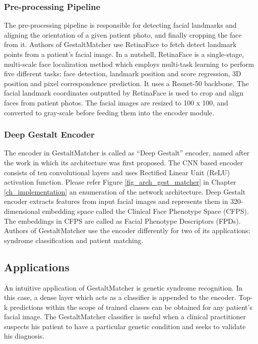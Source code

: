\documentclass[../report.tex]{subfiles}
\begin{document}
    \subsubsection{Pre-processing Pipeline}
    The pre-processing pipeline is responsible for detecting facial landmarks and aligning the orientation of a given patient photo, and finally cropping the face from it. Authors of GestaltMatcher use RetinaFace \cite{deng2020retinaface} to fetch detect landmark points from a patient's facial image.  In a nutshell, RetinaFace is a single-stage, multi-scale face localization method which employs multi-task learning to perform five different tasks: face detection, landmark position and score regression,  3D position and pixel correspondence prediction. It uses a Resnet-50 \cite{he2016deep} backbone. The facial landmark coordinates outputted by RetinaFace is used to crop and align faces from patient photos. The facial images are resized to 100 x 100, and converted to gray-scale before feeding them into the encoder module.
    
    \subsubsection{Deep Gestalt Encoder}
    The encoder in GestaltMatcher is called as \enquote{Deep Gestalt} encoder, named after the work \cite{Gurovich2019} in which its architecture was first proposed. The CNN based encoder consists of ten convolutional layers and uses Rectified Linear Unit (ReLU) activation function. Please refer Figure \ref{fig_arch_gest_matcher} in Chapter \ref{ch_implementation} an enumeration of the network architecture. Deep Gestalt encoder extracts features from input facial images and represents them in 320-dimensional embedding space called the Clinical Face Phenotype Space (CFPS). The embeddings in CFPS are called as Facial Phenotype Descriptors (FPDs). Authors of GestaltMatcher use the encoder differently for two of its applications: syndrome classification and patient matching.
    
    \subsection{Applications}
    An intuitive application of GestaltMatcher is genetic syndrome recognition. In this case, a dense layer which acts as a classifier is appended to the encoder. Top-k predictions within the scope of trained classes can be obtained for any patient's facial image. The GestaltMatcher classifier is useful when a clinical practitioner suspects his patient to have a particular genetic condition and seeks to validate his diagnosis.
    
\end{document}
